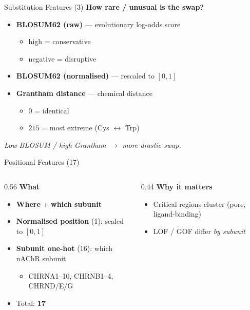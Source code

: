 \documentclass[aspectratio=169]{beamer}
\begin{document}
\begin{frame}{Substitution Features (3)}
\textbf{How rare / unusual is the swap?}
\medskip
\begin{itemize}\setlength\itemsep{0.5em}
  \item \textbf{BLOSUM62 (raw)} --- evolutionary log-odds score
        \begin{itemize}
          \item high = conservative
          \item negative = disruptive
        \end{itemize}
  \item \textbf{BLOSUM62 (normalised)} --- rescaled to $[0,1]$
  \item \textbf{Grantham distance} --- chemical distance
        \begin{itemize}
          \item $0$ = identical
          \item $215$ = most extreme (Cys $\leftrightarrow$ Trp)
        \end{itemize}
\end{itemize}
\medskip
\footnotesize\emph{Low BLOSUM / high Grantham $\rightarrow$ more drastic swap.}
\end{frame}

\begin{frame}{Positional Features (17)}
\begin{columns}[T]
\begin{column}{0.56\textwidth}
\textbf{What}
\begin{itemize}\setlength\itemsep{0.5em}
  \item \textbf{Where} + \textbf{which subunit}
  \item \textbf{Normalised position} (1): scaled to $[0,1]$
  \item \textbf{Subunit one-hot} (16): which nAChR subunit
        \begin{itemize}
          \item CHRNA1--10, CHRNB1--4, CHRND/E/G
        \end{itemize}
  \item Total: \textbf{17}
\end{itemize}
\end{column}
\begin{column}{0.44\textwidth}
\textbf{Why it matters}
\begin{itemize}\setlength\itemsep{0.5em}
  \item Critical regions cluster (pore, ligand-binding)
  \item LOF / GOF differ \emph{by subunit}
\end{itemize}
\end{column}
\end{columns}
\end{frame}
\end{document}
